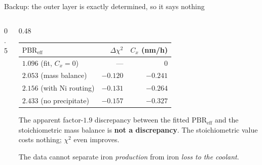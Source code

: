 \documentclass[aspectratio=169,10pt]{beamer}
\newcommand{\Cx}{C_{x}}
\newcommand{\PBR}{\mathrm{PBR}_{\mathrm{eff}}}
\begin{document}
\begin{frame}{Backup: the outer layer is exactly determined, so it says nothing}
\begin{columns}[T]
\begin{column}{0.5\textwidth}
\centering
{}
\end{column}
\begin{column}{0.48\textwidth}
\scriptsize
\begin{tabular}{lrr}
\toprule
$\PBR$ & $\Delta\chi^2$ & $\Cx$ (nm/h) \\
\midrule
$1.096$ (fit, $\Cx\!=\!0$) & --- & $0$ \\
$2.053$ (mass balance) & $-0.120$ & $-0.241$ \\
$2.156$ (with Ni routing) & $-0.131$ & $-0.264$ \\
$2.433$ (no precipitate) & $-0.157$ & $-0.327$ \\
\bottomrule
\end{tabular}

\vspace{0.8em}
\normalsize
The apparent factor-$1.9$ discrepancy between the fitted $\PBR$ and the
stoichiometric mass balance is \textbf{not a discrepancy}. The
stoichiometric value costs nothing; $\chi^2$ even improves.

\vspace{0.4em}
\footnotesize The data cannot separate iron \emph{production} from iron
\emph{loss to the coolant}.
\end{column}
\end{columns}
\end{frame}
\end{document}
